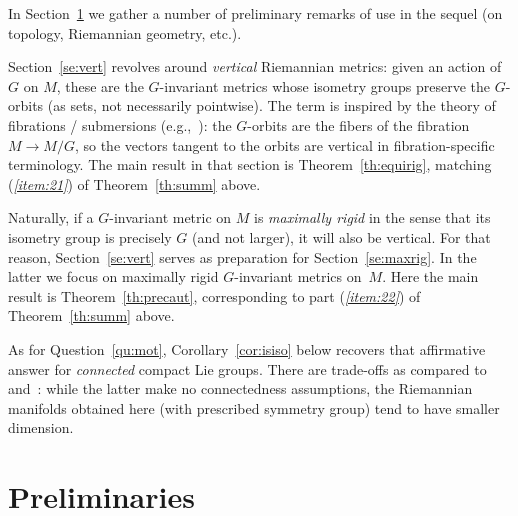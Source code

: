 \documentclass[pdftex]{sigma}%
\numberwithin{equation}{section}
\begin{document}
In Section~\ref{se:prel} we gather a number of preliminary remarks of use in the sequel (on topology, Riemannian geometry, etc.).

Section~\ref{se:vert} revolves around {\it vertical} Riemannian metrics: given an action of $G$ on $M$, these are the $G$-invariant metrics whose isometry groups preserve the $G$-orbits (as sets, not necessarily pointwise). The term is inspired by the theory of fibrations / submersions (e.g.,~\cite[Chapter~9]{bes}): the $G$-orbits are the fibers of the fibration $M\to M/G$, so the vectors tangent to the orbits are vertical in fibration-specific terminology. The main result in that section is Theorem~\ref{th:equirig}, matching ({\it \ref{item:21}}) of Theorem~\ref{th:summ} above.

Naturally, if a $G$-invariant metric on $M$ is {\it maximally rigid} in the sense that its isometry group is precisely $G$ (and not larger), it will also be vertical. For that reason, Section~\ref{se:vert} serves as preparation for Section~\ref{se:maxrig}. In the latter we focus on maximally rigid $G$-invariant metrics on~$M$. Here the main result is Theorem~\ref{th:precaut}, corresponding to part ({\it\ref{item:22}}) of Theorem~\ref{th:summ} above.

As for Question~\ref{qu:mot}, Corollary~\ref{cor:isiso} below recovers that affirmative answer for {\it connected} compact Lie groups. There are trade-offs as compared to~\cite[Theorem~3]{bd} and~\cite[Theorem~1]{sz}: while the latter make no connectedness assumptions, the Riemannian manifolds obtained here (with prescribed symmetry group) tend to have smaller dimension.

\section{Preliminaries}\label{se:prel}
\end{document}
